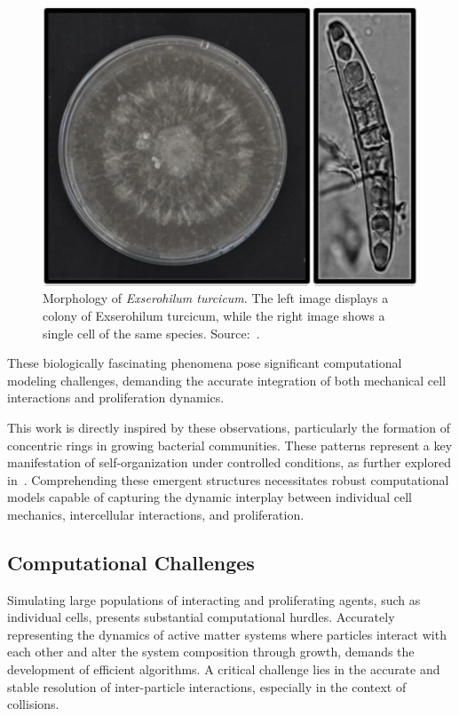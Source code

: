 \documentclass[conference]{IEEEtran}
\begin{document}
\begin{figure}
    \centering
    \includegraphics[width=\linewidth]{figures/real-bacteria/Exserohilum turcicum.png}
    \caption{Morphology of \textit{Exserohilum turcicum}. The left image displays a colony of Exserohilum turcicum, while the right image shows a single cell of the same species. Source:~\cite{Bankole2023}.}
    \label{fig:exserohilum_turcicum}
\end{figure}

These biologically fascinating phenomena pose significant computational modeling challenges, demanding the accurate integration of both mechanical cell interactions and proliferation dynamics.

This work is directly inspired by these observations, particularly the formation of concentric rings in growing bacterial communities. These patterns represent a key manifestation of self-organization under controlled conditions, as further explored in~\cite{Weady2024}. Comprehending these emergent structures necessitates robust computational models capable of capturing the dynamic interplay between individual cell mechanics, intercellular interactions, and proliferation.

\subsection{Computational Challenges}

Simulating large populations of interacting and proliferating agents, such as individual cells, presents substantial computational hurdles. Accurately representing the dynamics of active matter systems where particles interact with each other and alter the system composition through growth, demands the development of efficient algorithms. A critical challenge lies in the accurate and stable resolution of inter-particle interactions, especially in the context of collisions.
\end{document}
